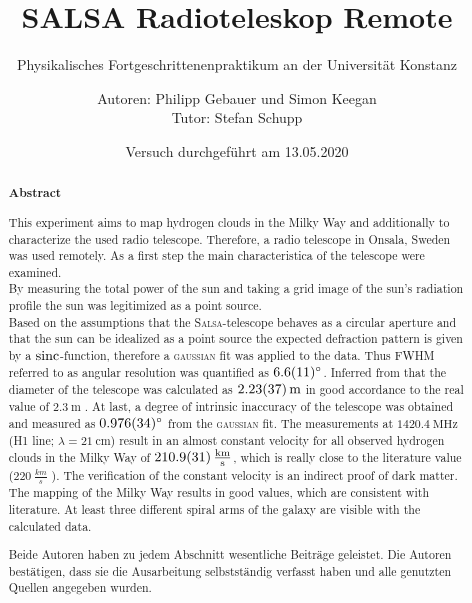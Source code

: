 \title{SALSA Radioteleskop Remote}
\subtitle{Physikalisches Fortgeschrittenenpraktikum an der Universität Konstanz}
\author{Autoren: Philipp Gebauer und Simon Keegan \\ \large{Tutor: Stefan Schupp}}
\date{Versuch durchgeführt am 13.05.2020}
\maketitle
\begin{abstract}
    \begin{center}
        \Large{\textsf{\textbf{Abstract}}}
    \end{center}
    \vspace{0.75 cm}
    \begin{singlespace}
    \noindent This experiment aims to map hydrogen clouds in the Milky Way and additionally to characterize the used radio telescope.
    Therefore, a radio telescope in Onsala, Sweden was used remotely.
    As a first step the main characteristica of the telescope were examined.\\
    By measuring the total power of the sun and taking a grid image of the sun's radiation profile the sun was legitimized as a point source. \\
    Based on the assumptions that the \textsc{Salsa}-telescope behaves as a circular aperture and that the sun can be idealized as a point source the expected defraction pattern is given by a $\operatorname{sinc}$-function, therefore a \textsc{gaussian} fit was applied to the data.
    Thus FWHM referred to as angular resolution was quantified as $\SI{6.6 \pm 1.1}{\degree}$.
    Inferred from that the diameter of the telescope was calculated as $\SI{2.23 \pm 0.37}{\metre}$ in good accordance to the real value of $\SI{2.3}{\metre}$ \cite{Usermanual}.
    At last, a degree of intrinsic inaccuracy of the telescope was obtained and measured as $\SI{0.976 \pm 0.034}{\degree}$ from the \textsc{gaussian} fit.\newline
    The measurements at $\SI{1420.4}{\mega \hertz}$ (H1 line; $\lambda = \SI{21}{\centi \metre}$) result in an almost constant velocity for all observed hydrogen clouds in the Milky Way of $\SI{210.9 \pm 3.1}{\frac{km}{s}}$, which is really close to the literature value ($\SI{220}{\frac{km}{s}}$ \cite{LSR}).
    The verification of the constant velocity is an indirect proof of dark matter.\newline
    The mapping of the Milky Way results in good values, which are consistent with literature. 
    At least three different spiral arms of the galaxy are visible with the calculated data.
    \vspace{0.75 cm}
     
    \noindent Beide Autoren haben zu jedem Abschnitt wesentliche Beiträge geleistet. Die Autoren bestätigen, dass sie die Ausarbeitung selbstständig verfasst haben und alle genutzten Quellen angegeben wurden.

\end{singlespace}
\end{abstract}

\thispagestyle{empty}
\newpage